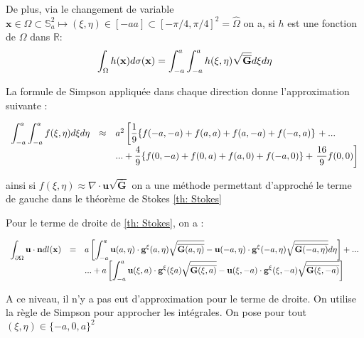 De plus, via le changement de variable $\mathbf{x} \in \Omega \subset \mathbb{S}_a^2 \mapsto (\xi, \eta) \in [-a a] \subset [- \pi/4, \pi/4]^2 = \hat{\Omega}$ on a, si $h$ est une fonction de $\Omega$ dans $\mathbb{R}$:
\begin{equation}
\displaystyle\int_{\Omega} h(\mathbf{x}) d \sigma ( \mathbf{x} ) = \displaystyle\int_{-a}^a \displaystyle\int_{-a}^a h(\xi, \eta) \sqrt{\overline{\mathbf{G}}}d\xi d\eta
\end{equation}

La formule de Simpson appliquée dans chaque direction donne l'approximation suivante :

\begin{equation}
\begin{array}{rcl}
\displaystyle\int_{-a}^a \displaystyle\int_{-a}^a f(\xi, \eta)d\xi d\eta & \approx & a^2 \left[ \dfrac{1}{9} \lbrace  f(-a,-a) + f(a,a) + f(a,-a) + f(-a,a) \rbrace \right. + ...\\
& & ...+ \dfrac{4}{9} \lbrace  f(0,-a) + f(0,a) + f(a,0) + f(-a,0) \rbrace +  \left. \dfrac{16}{9} f(0,0) \right]
\end{array}
\end{equation}

ainsi si $f(\xi, \eta) \approx \nabla \cdot \mathbf{u} \sqrt{\overline{\mathbf{G}}}$ on a une méthode permettant d'approché le terme de gauche dans le théorème de Stokes \ref{th: Stokes}

Pour le terme de droite de \ref{th: Stokes}, on a :

\begin{equation}
\begin{array}{rcl}
\displaystyle\int_{\partial \Omega} \mathbf{u} \cdot \mathbf{n} dl(\mathbf{x}) & = & a \left[ \displaystyle\int_{-a}^a \mathbf{u}(a,\eta) \cdot \mathbf{g}^{\xi} (a, \eta) \sqrt{\overline{\mathbf{G}(a,\eta)}}- \mathbf{u}(-a,\eta) \cdot \mathbf{g}^{\xi} (-a, \eta) \sqrt{\overline{\mathbf{G}(-a,\eta)}} d\eta \right]+ ...\\
&  & ... + a \left[ \displaystyle\int_{-a}^a \mathbf{u}(\xi,a) \cdot \mathbf{g}^{\xi} (\xi a) \sqrt{\overline{\mathbf{G}(\xi,a)}}- \mathbf{u}(\xi,-a) \cdot \mathbf{g}^{\xi} (\xi, -a) \sqrt{\overline{\mathbf{G}(\xi,-a)}}\right]
\end{array}
\label{eq: quadrature simpson L}
\end{equation}

A ce niveau, il n'y a pas eut d'approximation pour le terme de droite. On utilise la règle de Simpson pour approcher les intégrales. On pose pour tout $(\xi, \eta) \in \lbrace -a, 0, a \rbrace^2$

